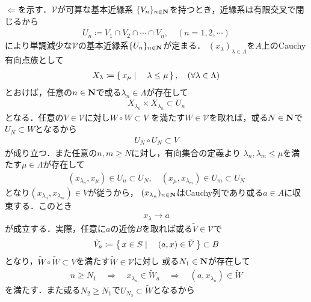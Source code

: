 	\begin{prf}
		$\Longleftarrow$を示す．$\mathscr{V}$が可算な基本近縁系
		$\{V_n\}_{n \in \mathbf{N}}$を持つとき，近縁系は有限交叉で閉じるから
		\begin{align}
			U_n \coloneqq V_1 \cap V_2 \cap \cdots \cap V_n,
			\quad (n = 1,2,\cdots)
		\end{align}
		により単調減少な$\mathscr{V}$の基本近縁系$\{U_n\}_{n \in \mathbf{N}}$が定まる．
		$(x_\lambda)_{\lambda \in \Lambda}$を$A$上のCauchy有向点族として
		\begin{align}
			X_\lambda \coloneqq \left\{\, x_\mu \mid \quad \lambda \leq \mu\, \right\},
			\quad (\forall \lambda \in \Lambda)
		\end{align}
		とおけば，任意の$n \in \mathbf{N}$で或る$\lambda_n \in \Lambda$が存在して
		\begin{align}
			X_{\lambda_n} \times X_{\lambda_n} \subset U_n
		\end{align}
		となる．任意の$V \in \mathscr{V}$に対し$W \circ W \subset V$
		を満たす$W \in \mathscr{V}$を取れば，或る$N \in \mathbf{N}$で$U_N \subset W$となるから
		\begin{align}
			U_N \circ U_N \subset V
		\end{align}
		が成り立つ．また任意の$n,m \geq N$に対し，有向集合の定義より
		$\lambda_n,\lambda_m \leq \mu$を満たす$\mu \in \Lambda$が存在して
		\begin{align}
			(x_{\lambda_n},x_\mu) \in U_n \subset U_N,
			\quad (x_\mu, x_{\lambda_m}) \in U_m \subset U_N
		\end{align}
		となり$(x_{\lambda_n},x_{\lambda_m}) \in V$が従うから，
		$(x_{\lambda_n})_{n \in \mathbf{N}}$はCauchy列であり或る$a \in A$に収束する．このとき
		\begin{align}
			x_\lambda \longrightarrow a
			\label{eq:thm_complete_iff_every_Cauchy_seq_converges_if_entourage_contains_some_countable_subset}
		\end{align}
		が成立する．実際，任意に$a$の近傍$B$を取れば或る$\tilde{V} \in \mathscr{V}$で
		\begin{align}
			\tilde{V}_a \coloneqq \left\{\, x \in S \mid \quad (a,x) \in \tilde{V}\, \right\} \subset B
		\end{align}
		となり，$\tilde{W} \circ \tilde{W} \subset V$を満たす$\tilde{W} \in \mathscr{V}$に対し
		或る$N_1 \in \mathbf{N}$が存在して
		\begin{align}
			n \geq N_1 \quad \Longrightarrow \quad
			x_{\lambda_n} \in \tilde{W}_a \quad \Longrightarrow \quad
			(a,x_{\lambda_n}) \in \tilde{W}
		\end{align}
		を満たす．また或る$N_2 \geq N_1$で$U_{N_2} \subset \tilde{W}$となるから

\end{prf}

